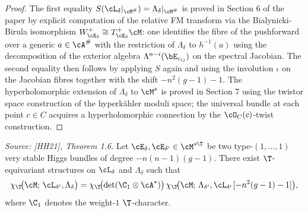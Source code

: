 \begin{proof}
  The first equality \(S(\cL_\delta|_{\cM^{\#}}) = \Lambda_\delta|_{\cM^{\#}}\) is proved in
  Section 6 of the paper by explicit computation of the relative FM transform via the
  Bialynicki-Birula isomorphism \(W^+_{\cE_\delta} \cong T^+_{\cE_\delta}\cM\): one identifies
  the fibre of the pushforward over a generic \(a \in \cA^{\#}\) with the restriction of
  \(\Lambda_\delta\) to \(h^{-1}(a)\) using the decomposition of the exterior algebra
  \(\Lambda^{n-i}(\bE_{c_{ij}})\) on the spectral Jacobian.  The second equality then follows
  by applying \(S\) again and using the involution \(\iota\) on the Jacobian fibres together with
  the shift \(-n^2(g-1)-1\).  The hyperholomorphic extension of \(\Lambda_\delta\) to \(\cM^s\)
  is proved in Section 7 using the twistor space construction of the hyperkähler moduli space;
  the universal bundle at each point \(c \in C\) acquires a hyperholomorphic connection by the
  \(\cO_C(c)\)-twist construction.
\end{proof}

\begin{theorem}
  \label{thm:euler_pairing_agreement}
  \textit{Source: [HH21], Theorem 1.6.}
  Let \(\cE_\delta, \cE_{\delta'} \in \cM^{s\T}\) be two type-\((1,\ldots,1)\) very stable
  Higgs bundles of degree \(-n(n-1)(g-1)\).  There exist \(\T\)-equivariant structures on
  \(\cL_\delta\) and \(\Lambda_\delta\) such that
  \[
    \chi_{\T}\!\bigl(\cM;\, \cL_{\delta'}, \Lambda_\delta\bigr)
    = \chi_{\T}\!\bigl(\det(\C_1 \otimes \cA^*)\bigr)\,
      \chi_{\T}\!\bigl(\cM;\, \Lambda_{\delta'}, \cL_{\delta^{\iota}}[-n^2(g-1)-1]\bigr),
  \]
  where \(\C_1\) denotes the weight-\(1\) \(\T\)-character.
\end{theorem}

